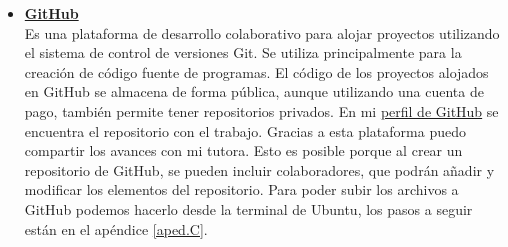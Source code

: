 \begin{itemize}
\item \href{https://github.com/}{\textbf{GitHub}}\\
Es una plataforma de desarrollo colaborativo para alojar proyectos utilizando el sistema de control de versiones Git. Se utiliza principalmente para la creación de código fuente de programas. El código de los proyectos alojados en GitHub se almacena de forma pública, aunque utilizando una cuenta de pago, también permite tener repositorios privados. En mi \href{https://github.com/AngelaGM10}{perfil de GitHub} se encuentra el repositorio con el trabajo. Gracias a esta plataforma puedo compartir los avances con mi tutora. Esto es posible porque al crear un repositorio de GitHub, se pueden incluir colaboradores, que podrán añadir y modificar los elementos del repositorio. Para poder subir los archivos a GitHub podemos hacerlo desde la terminal de Ubuntu, los pasos a seguir están en el apéndice \ref{aped.C}.

\end{itemize}